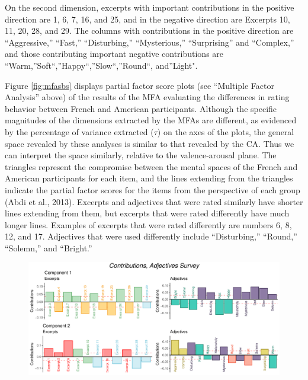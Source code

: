 \documentclass[
  english,
  man,floatsintext]{apa6}
\begin{document}
On the second dimension, excerpts with important contributions in the positive direction are 1, 6, 7, 16, and 25, and in the negative direction are Excerpts 10, 11, 20, 28, and 29. The columns with contributions in the positive direction are ``Aggressive,'' ``Fast,'' ``Disturbing,'' ``Mysterious,'' ``Surprising'' and ``Complex,'' and those contributing important negative contributions are ``Warm,''Soft``,''Happy``,''Slow``,''Round``, and''Light".

Figure \ref{fig:mfasbs} displays partial factor score plots (see ``Multiple Factor Analysis'' above) of the results of the MFA evaluating the differences in rating behavior between French and American participants. Although the specific magnitudes of the dimensions extracted by the MFAs are different, as evidenced by the percentage of variance extracted (\(\tau\)) on the axes of the plots, the general space revealed by these analyses is similar to that revealed by the CA. Thus we can interpret the space similarly, relative to the valence-arousal plane. The triangles represent the compromise between the mental spaces of the French and American participants for each item, and the lines extending from the triangles indicate the partial factor scores for the items from the perspective of each group (Abdi et al., 2013). Excerpts and adjectives that were rated similarly have shorter lines extending from them, but excerpts that were rated differently have much longer lines. Examples of excerpts that were rated differently are numbers 6, 8, 12, and 17. Adjectives that were used differently include ``Disturbing,'' ``Round,'' ``Solemn,'' and ``Bright.''

\begin{figure}

{\centering \includegraphics{Music-Descriptor-Space_files/figure-latex/contributionsA-1} 

}

\caption{ }\label{fig:contributionsA}
\end{figure}
\end{document}
